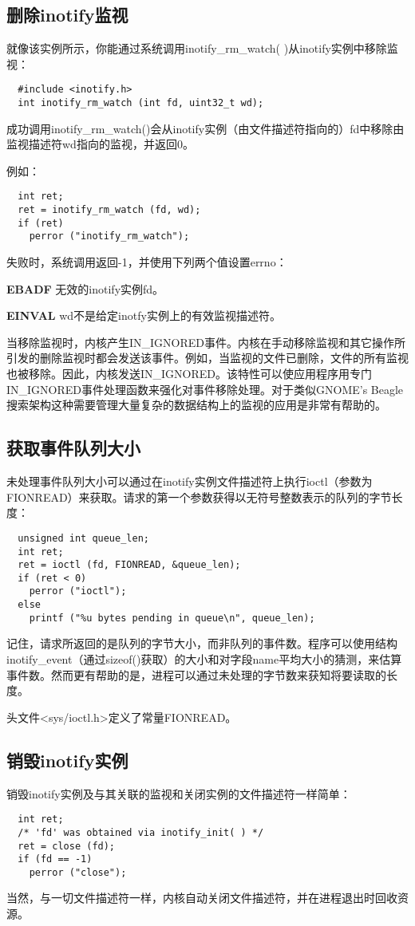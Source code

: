 \subsection{删除inotify监视}

就像该实例所示，你能通过系统调用inotify\_rm\_watch( )从inotify实例中移除监视：

\begin{lstlisting}
  #include <inotify.h>
  int inotify_rm_watch (int fd, uint32_t wd);
\end{lstlisting}

成功调用inotify\_rm\_watch()会从inotify实例（由文件描述符指向的）fd中移除由监视描述符wd指向的监视，并返回0。

例如：

\begin{lstlisting}
  int ret;
  ret = inotify_rm_watch (fd, wd);
  if (ret)
    perror ("inotify_rm_watch");
\end{lstlisting}

失败时，系统调用返回-1，并使用下列两个值设置errno：

\begin{eqlist*}
\item[\textbf{EBADF}] 无效的inotify实例fd。
\item[\textbf{EINVAL}] wd不是给定inotfy实例上的有效监视描述符。
\end{eqlist*}

当移除监视时，内核产生IN\_IGNORED事件。内核在手动移除监视和其它操作所引发的删除监视时都会发送该事件。例如，当监视的文件已删除，文件的所有监视也被移除。因此，内核发送IN\_IGNORED。该特性可以使应用程序用专门IN\_IGNORED事件处理函数来强化对事件移除处理。对于类似GNOME’s Beagle搜索架构这种需要管理大量复杂的数据结构上的监视的应用是非常有帮助的。

\subsection{获取事件队列大小}

未处理事件队列大小可以通过在inotify实例文件描述符上执行ioctl（参数为FIONREAD）来获取。请求的第一个参数获得以无符号整数表示的队列的字节长度：

\begin{lstlisting}
  unsigned int queue_len;
  int ret;
  ret = ioctl (fd, FIONREAD, &queue_len);
  if (ret < 0)
    perror ("ioctl");
  else
    printf ("%u bytes pending in queue\n", queue_len);
\end{lstlisting}

记住，请求所返回的是队列的字节大小，而非队列的事件数。程序可以使用结构inotify\_event（通过sizeof()获取）的大小和对字段name平均大小的猜测，来估算事件数。然而更有帮助的是，进程可以通过未处理的字节数来获知将要读取的长度。

头文件<sys/ioctl.h>定义了常量FIONREAD。

\subsection{销毁inotify实例}

销毁inotify实例及与其关联的监视和关闭实例的文件描述符一样简单：

\begin{lstlisting}
  int ret;
  /* 'fd' was obtained via inotify_init( ) */
  ret = close (fd);
  if (fd == -1)
    perror ("close");
\end{lstlisting}

当然，与一切文件描述符一样，内核自动关闭文件描述符，并在进程退出时回收资源。
